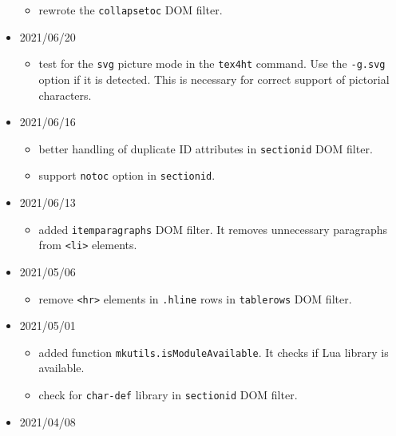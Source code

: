 \begin{itemize}
  \begin{itemize}
  \tightlist
  \item
    rewrote the \texttt{collapsetoc} DOM filter.
  \end{itemize}
\item
  2021/06/20

  \begin{itemize}
  \tightlist
  \item
    test for the \texttt{svg} picture mode in the \texttt{tex4ht}
    command. Use the \texttt{-g.svg} option if it is detected. This is
    necessary for correct support of pictorial characters.
  \end{itemize}
\item
  2021/06/16

  \begin{itemize}
  \tightlist
  \item
    better handling of duplicate ID attributes in \texttt{sectionid} DOM
    filter.
  \item
    support \texttt{notoc} option in \texttt{sectionid}.
  \end{itemize}
\item
  2021/06/13

  \begin{itemize}
  \tightlist
  \item
    added \texttt{itemparagraphs} DOM filter. It removes unnecessary
    paragraphs from \texttt{\textless{}li\textgreater{}} elements.
  \end{itemize}
\item
  2021/05/06

  \begin{itemize}
  \tightlist
  \item
    remove \texttt{\textless{}hr\textgreater{}} elements in
    \texttt{.hline} rows in \texttt{tablerows} DOM filter.
  \end{itemize}
\item
  2021/05/01

  \begin{itemize}
  \tightlist
  \item
    added function \texttt{mkutils.isModuleAvailable}. It checks if Lua
    library is available.
  \item
    check for \texttt{char-def} library in \texttt{sectionid} DOM
    filter.
  \end{itemize}
\item
  2021/04/08


\end{itemize}

